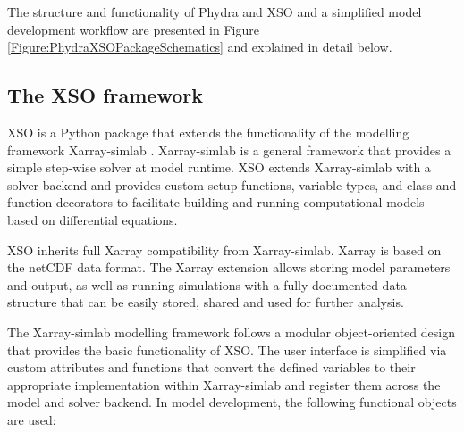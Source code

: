 \documentclass[journal abbreviation, manuscript]{copernicus}
\begin{document}
The structure and functionality of Phydra and XSO and a simplified model development workflow are presented in Figure \ref{Figure:PhydraXSOPackageSchematics} and explained in detail below.

\subsection{The XSO framework} \label{Section:XSOFramework}

XSO is a Python package that extends the functionality of the modelling framework Xarray-simlab \citep{Bovy2018Xarray-simlab:Interactively}. Xarray-simlab is a general framework that provides a simple step-wise solver at model runtime. XSO extends Xarray-simlab with a solver backend and provides custom setup functions, variable types, and class and function decorators to facilitate building and running computational models based on differential equations.

XSO inherits full Xarray compatibility from Xarray-simlab. Xarray is based on the netCDF data format. The Xarray extension allows storing model parameters and output, as well as running simulations with a fully documented data structure that can be easily stored, shared and used for further analysis.

The Xarray-simlab modelling framework follows a modular object-oriented design that provides the basic functionality of XSO. The user interface is simplified via custom attributes and functions that convert the defined variables to their appropriate implementation within Xarray-simlab and register them across the model and solver backend. In model development, the following functional objects are used:
\end{document}
